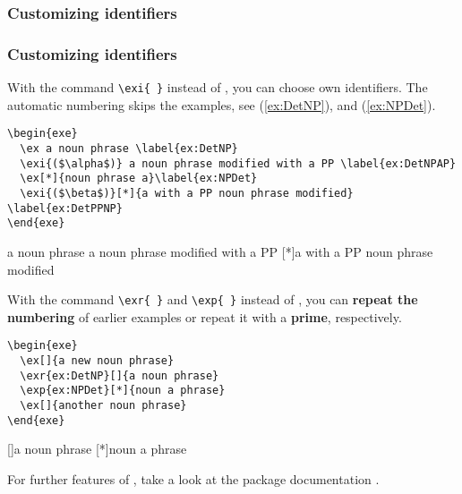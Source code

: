 \subsubsection{Customizing identifiers}

\begin{frame}[fragile]
\frametitle{Customizing identifiers}

With the command \lstinline|\exi{ }| instead of , you can choose own identifiers. 
The automatic numbering skips the  examples, see (\ref{ex:DetNP}), %
and (\ref{ex:NPDet}).%

\begin{lstlisting}
\begin{exe}
  \ex a noun phrase \label{ex:DetNP}
  \exi{($\alpha$)} a noun phrase modified with a PP \label{ex:DetNPAP}
  \ex[*]{noun phrase a}\label{ex:NPDet}
  \exi{($\beta$)}[*]{a with a PP noun phrase modified} \label{ex:DetPPNP}
\end{exe}
\end{lstlisting}


\begin{exe}
\ex a noun phrase \label{ex:DetNP}
\exi{($\alpha$)} a noun phrase modified with a PP \label{ex:DetNPAP}
\label{ex:NPDet}
\exi{($\beta$)}[*]{a with a PP noun phrase modified} \label{ex:DetPPNP}
\end{exe}


\end{frame}


\begin{frame}[fragile]

With the command \lstinline|\exr{ }| and \lstinline|\exp{ }| instead of , you can \textbf{repeat the numbering} of earlier examples or repeat it with a \textbf{prime}, respectively. 

\begin{lstlisting}
\begin{exe}
  \ex[]{a new noun phrase}
  \exr{ex:DetNP}[]{a noun phrase}
  \exp{ex:NPDet}[*]{noun a phrase}
  \ex[]{another noun phrase}
\end{exe}
\end{lstlisting}

\begin{exe}
	[]{a noun phrase}
	{noun a phrase}
\end{exe}


For further features of , take a look at the package documentation \citep{Kolb&Co10a}.

\end{frame}


